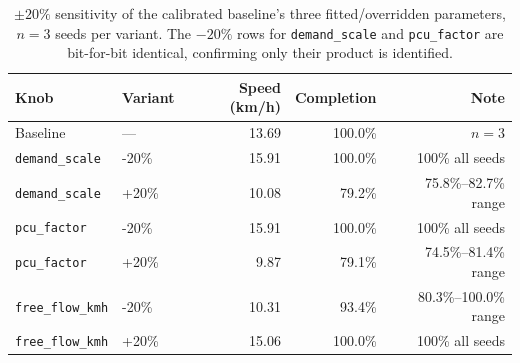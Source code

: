 \begin{table}[htbp]
\centering
\caption{$\pm20\%$ sensitivity of the calibrated baseline's three fitted/overridden parameters, $n=3$ seeds per variant. The $-20\%$ rows for \texttt{demand\_scale} and \texttt{pcu\_factor} are bit-for-bit identical, confirming only their product is identified.}
\label{tab:sensitivity}
\begin{tabular}{llrrr}
\hline
Knob & Variant & Speed (km/h) & Completion & Note \\
\hline
Baseline & --- & 13.69 & 100.0\% & $n=3$ \\
\texttt{demand\_scale} & -20\% & 15.91 & 100.0\% & 100\% all seeds \\
\texttt{demand\_scale} & +20\% & 10.08 & 79.2\% & 75.8\%--82.7\% range \\
\texttt{pcu\_factor} & -20\% & 15.91 & 100.0\% & 100\% all seeds \\
\texttt{pcu\_factor} & +20\% & 9.87 & 79.1\% & 74.5\%--81.4\% range \\
\texttt{free\_flow\_kmh} & -20\% & 10.31 & 93.4\% & 80.3\%--100.0\% range \\
\texttt{free\_flow\_kmh} & +20\% & 15.06 & 100.0\% & 100\% all seeds \\
\hline
\end{tabular}
\end{table}
